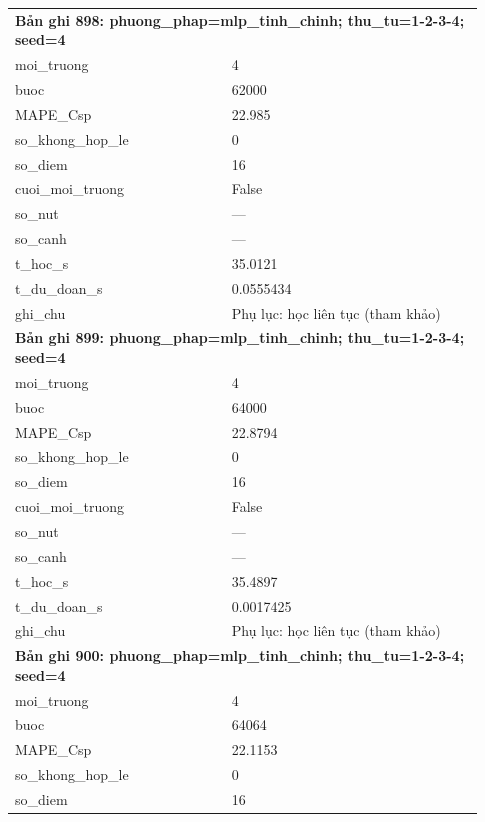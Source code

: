 \begin{longtable}{p{0.43\linewidth}p{0.50\linewidth}}
\midrule
\multicolumn{2}{p{0.95\linewidth}}{\textbf{Bản ghi 898: phuong\_phap=mlp\_tinh\_chinh; thu\_tu=1-2-3-4; seed=4}} \\
moi\_\allowbreak truong & 4 \\
buoc & 62000 \\
MAPE\_\allowbreak Csp & 22.985 \\
so\_\allowbreak khong\_\allowbreak hop\_\allowbreak le & 0 \\
so\_\allowbreak diem & 16 \\
cuoi\_\allowbreak moi\_\allowbreak truong & False \\
so\_\allowbreak nut & — \\
so\_\allowbreak canh & — \\
t\_\allowbreak hoc\_\allowbreak s & 35.0121 \\
t\_\allowbreak du\_\allowbreak doan\_\allowbreak s & 0.0555434 \\
ghi\_\allowbreak chu & Phụ lục: học liên tục (tham khảo) \\
\midrule
\multicolumn{2}{p{0.95\linewidth}}{\textbf{Bản ghi 899: phuong\_phap=mlp\_tinh\_chinh; thu\_tu=1-2-3-4; seed=4}} \\
moi\_\allowbreak truong & 4 \\
buoc & 64000 \\
MAPE\_\allowbreak Csp & 22.8794 \\
so\_\allowbreak khong\_\allowbreak hop\_\allowbreak le & 0 \\
so\_\allowbreak diem & 16 \\
cuoi\_\allowbreak moi\_\allowbreak truong & False \\
so\_\allowbreak nut & — \\
so\_\allowbreak canh & — \\
t\_\allowbreak hoc\_\allowbreak s & 35.4897 \\
t\_\allowbreak du\_\allowbreak doan\_\allowbreak s & 0.0017425 \\
ghi\_\allowbreak chu & Phụ lục: học liên tục (tham khảo) \\
\midrule
\multicolumn{2}{p{0.95\linewidth}}{\textbf{Bản ghi 900: phuong\_phap=mlp\_tinh\_chinh; thu\_tu=1-2-3-4; seed=4}} \\
moi\_\allowbreak truong & 4 \\
buoc & 64064 \\
MAPE\_\allowbreak Csp & 22.1153 \\
so\_\allowbreak khong\_\allowbreak hop\_\allowbreak le & 0 \\
so\_\allowbreak diem & 16 \\

\end{longtable}
